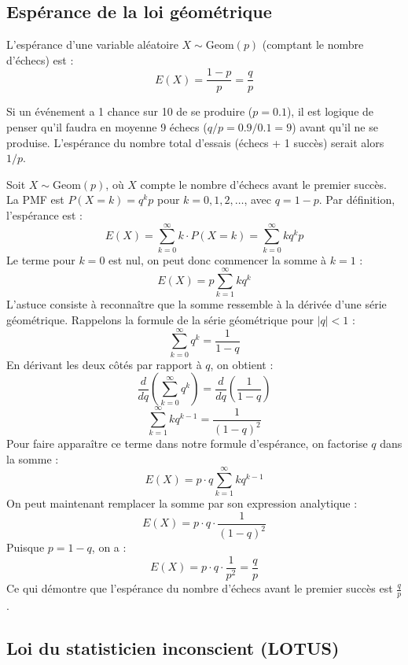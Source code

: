 \subsection{Espérance de la loi géométrique}
\begin{theorembox}
L'espérance d'une variable aléatoire $X \sim \text{Geom}(p)$ (comptant le nombre d'échecs) est :
$$ E(X) = \frac{1-p}{p} = \frac{q}{p} $$
\end{theorembox}

\begin{intuitionbox}
Si un événement a 1 chance sur 10 de se produire ($p=0.1$), il est logique de penser qu'il faudra en moyenne 9 échecs ($q/p = 0.9/0.1=9$) avant qu'il ne se produise. L'espérance du nombre total d'essais (échecs + 1 succès) serait alors $1/p$.
\end{intuitionbox}

\begin{proofbox}
Soit $X \sim \text{Geom}(p)$, où $X$ compte le nombre d'échecs avant le premier succès. La PMF est $P(X=k) = q^k p$ pour $k=0, 1, 2, \dots$, avec $q=1-p$.
\newline
Par définition, l'espérance est :
$$ E(X) = \sum_{k=0}^{\infty} k \cdot P(X=k) = \sum_{k=0}^{\infty} k q^k p $$
Le terme pour $k=0$ est nul, on peut donc commencer la somme à $k=1$ :
$$ E(X) = p \sum_{k=1}^{\infty} k q^k $$
L'astuce consiste à reconnaître que la somme ressemble à la dérivée d'une série géométrique. Rappelons la formule de la série géométrique pour $|q|<1$ :
$$ \sum_{k=0}^{\infty} q^k = \frac{1}{1-q} $$
En dérivant les deux côtés par rapport à $q$, on obtient :
$$ \frac{d}{dq} \left( \sum_{k=0}^{\infty} q^k \right) = \frac{d}{dq} \left( \frac{1}{1-q} \right) $$
$$ \sum_{k=1}^{\infty} k q^{k-1} = \frac{1}{(1-q)^2} $$
Pour faire apparaître ce terme dans notre formule d'espérance, on factorise $q$ dans la somme :
$$ E(X) = p \cdot q \sum_{k=1}^{\infty} k q^{k-1} $$
On peut maintenant remplacer la somme par son expression analytique :
$$ E(X) = p \cdot q \cdot \frac{1}{(1-q)^2} $$
Puisque $p = 1-q$, on a :
$$ E(X) = p \cdot q \cdot \frac{1}{p^2} = \frac{q}{p} $$
Ce qui démontre que l'espérance du nombre d'échecs avant le premier succès est $\frac{q}{p}$.
\end{proofbox}

\subsection{Loi du statisticien inconscient (LOTUS)}

